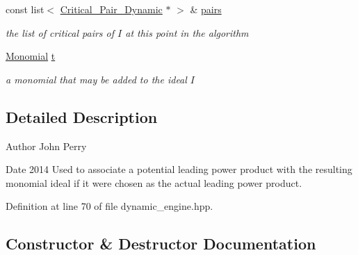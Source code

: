 \begin{DoxyCompactItemize}
\mbox{\label{class_p_p_with_ideal_a95ee2432221feb207ae032a4e3946858}} 
const list$<$ \hyperlink{class_critical___pair___dynamic}{Critical\+\_\+\+Pair\+\_\+\+Dynamic} $\ast$ $>$ \& \hyperlink{class_p_p_with_ideal_a95ee2432221feb207ae032a4e3946858}{pairs}
\begin{DoxyCompactList}\small\item\em the list of critical pairs of $I$ at this point in the algorithm \end{DoxyCompactList}\item 
\mbox{\label{class_p_p_with_ideal_a45e8e20417c6213edd71bc5ee6e2f6cd}} 
\hyperlink{class_monomial}{Monomial} \hyperlink{class_p_p_with_ideal_a45e8e20417c6213edd71bc5ee6e2f6cd}{t}
\begin{DoxyCompactList}\small\item\em a monomial that may be added to the ideal $I$ \end{DoxyCompactList}\end{DoxyCompactItemize}


\subsection{Detailed Description}
\begin{DoxyAuthor}{Author}
John Perry 
\end{DoxyAuthor}
\begin{DoxyDate}{Date}
2014 Used to associate a potential leading power product with the resulting monomial ideal if it were chosen as the actual leading power product. 
\end{DoxyDate}


Definition at line 70 of file dynamic\+\_\+engine.\+hpp.



\subsection{Constructor \& Destructor Documentation}
\mbox{\label{class_p_p_with_ideal_a4aaab17f2c6c03dfe1b6cc6bb2ca3f73}} 
